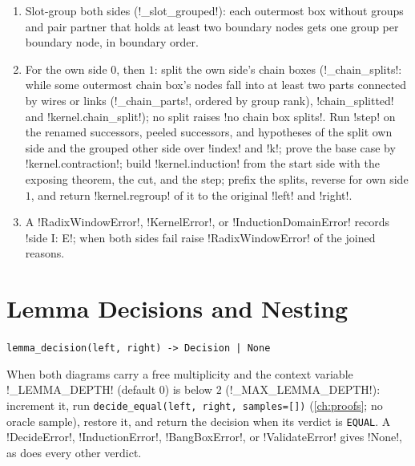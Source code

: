 \begin{algorithm}\label{alg:kernel-regrouped-induction}
\begin{enumerate}
\item Slot-group both sides (\py!_slot_grouped!): each outermost box without groups and pair partner that holds at least two boundary nodes gets one group per boundary node, in boundary order.
\item For the own side $0$, then $1$: split the own side's chain boxes (\py!_chain_splits!: while some outermost chain box's nodes fall into at least two parts connected by wires or links (\py!_chain_parts!, ordered by group rank), \py!chain_splitted! and \py!kernel.chain_split!); no split raises \code!no chain box splits!. Run \py!step! on the renamed successors, peeled successors, and hypotheses of the split own side and the grouped other side over \code!index! and \code!k!; prove the base case by \py!kernel.contraction!; build \py!kernel.induction! from the start side with the exposing theorem, the cut, and the step; prefix the splits, reverse for own side $1$, and return \py!kernel.regroup! of it to the original \code!left! and \code!right!.
\item A \py!RadixWindowError!, \py!KernelError!, or \py!InductionDomainError! records \code!side I: E!; when both sides fail raise \py!RadixWindowError! of the joined reasons.
\end{enumerate}
\end{algorithm}

\section{Lemma Decisions and Nesting}\label{sec:kernel-lemma-decision}

\begin{signature}
\texttt{lemma\_\allowbreak{}decision(\allowbreak{}left,\allowbreak{} right) -> Decision | None}

When both diagrams carry a free multiplicity and the context variable \py!_LEMMA_DEPTH! (default $0$) is below $2$ (\py!_MAX_LEMMA_DEPTH!): increment it, run \texttt{decide\_\allowbreak{}equal(\allowbreak{}left,\allowbreak{} right,\allowbreak{} samples=[])} (\cref{ch:proofs}; no oracle sample), restore it, and return the decision when its verdict is \texttt{EQUAL}. A \py!DecideError!, \py!InductionError!, \py!BangBoxError!, or \py!ValidateError! gives \py!None!, as does every other verdict.
\end{signature}

